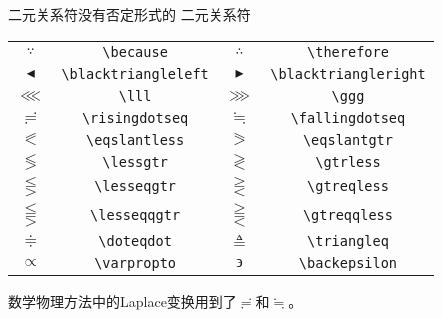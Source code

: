 \documentclass[mathserif]{beamer}
\begin{document}
\begin{frame}[fragile]{二元关系符}{没有否定形式的 \AmS{} 二元关系符}
\begin{table}[H]
\centering
\begin{tabular}{cc|cc}
	\toprule
	$\because$ & \lstinline'\because' & $\therefore$ & \lstinline'\therefore' \\
	$\blacktriangleleft$ & \lstinline'\blacktriangleleft' & $\blacktriangleright$ & \lstinline'\blacktriangleright' \\
	$\lll$ & \lstinline'\lll' & $\ggg$ & \lstinline'\ggg' \\
	$\risingdotseq$ & \lstinline'\risingdotseq' & $\fallingdotseq$ & \lstinline'\fallingdotseq' \\
	$\eqslantless$ & \lstinline'\eqslantless' & $\eqslantgtr$ & \lstinline'\eqslantgtr' \\
	$\lessgtr$ & \lstinline'\lessgtr' & $\gtrless$ & \lstinline'\gtrless' \\
	$\lesseqgtr$ & \lstinline'\lesseqgtr' & $\gtreqless$ & \lstinline'\gtreqless' \\
	$\lesseqqgtr$ & \lstinline'\lesseqqgtr' & $\gtreqqless$ & \lstinline'\gtreqqless' \\
	$\doteqdot$ & \lstinline'\doteqdot' & $\triangleq$ & \lstinline'\triangleq' \\
	$\varpropto$ & \lstinline'\varpropto' & $\backepsilon$ & \lstinline'\backepsilon' \\
	\bottomrule
\end{tabular}
\end{table}
数学物理方法中的Laplace变换用到了$\risingdotseq$和$\fallingdotseq$。
\end{frame}
\end{document}

